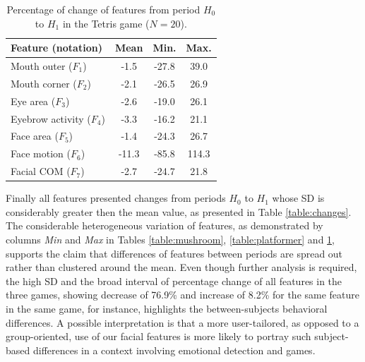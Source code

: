 \begin{table}
    \caption{Percentage of change of features from period $H_0$ to $H_1$ in the Tetris game ($N=20$).}
    \label{table:tetris}
    \centering
    \begin{threeparttable}
        \begin{tabular}{lccc}
            \hline
                \textbf{Feature (notation)} & \textbf{Mean} & \textbf{Min.} & \textbf{Max.} \\
            \hline
                Mouth outer ($F_1$)      & -1.5  & -27.8 & 39.0  \\
                Mouth corner ($F_2$)     & -2.1  & -26.5 & 26.9  \\
            \hline
                Eye area ($F_3$)         & -2.6  & -19.0 & 26.1  \\
                Eyebrow activity ($F_4$) & -3.3  & -16.2 & 21.1  \\
            \hline
                Face area ($F_5$)        & -1.4  & -24.3 & 26.7  \\
                Face motion ($F_6$)      & -11.3 & -85.8 & 114.3 \\
                Facial COM ($F_7$)       & -2.7  & -24.7 & 21.8  \\
            \hline
        \end{tabular}
        \begin{tablenotes}
          \small
          \item[]{}
        \end{tablenotes}
    \end{threeparttable}
\end{table}

Finally all features presented changes from periods $H_0$ to $H_1$ whose SD is considerably greater then the mean value, as presented in Table \ref{table:changes}. The considerable heterogeneous variation of features, as demonstrated by columns \textit{Min} and \textit{Max} in Tables \ref{table:mushroom}, \ref{table:platformer} and \ref{table:tetris}, supports the claim that differences of features between periods are spread out rather than clustered around the mean. Even though further analysis is required, the high SD and the broad interval of percentage change of all features in the three games, showing decrease of 76.9\% and increase of 8.2\% for the same feature in the same game, for instance, highlights the between-subjects behavioral differences. A possible interpretation is that a more user-tailored, as opposed to a group-oriented, use of our facial features is more likely to portray such subject-based differences in a context involving emotional detection and games.

